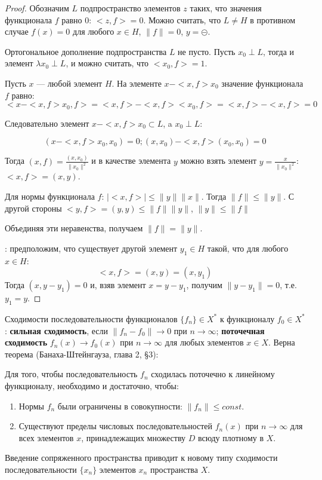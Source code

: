 \documentclass[12pt,a4paper,titlepage,oneside]{book}
\theoremstyle{definition}
\theoremstyle{plain}
\theoremstyle{remark}
\theoremstyle{remark}
\theoremstyle{remark}
\theoremstyle{remark}
\theoremstyle{plain}
\theoremstyle{plain}
\begin{document}
\begin{proof}
Обозначим $L$ подпространство элементов $z$ таких, что значения функционала $f$ равно 0: $<z, f>=0$. Можно считать, что $L\ne H$ в противном случае $f(x)=0$ для любого $x\in H$, $\lVert f\rVert = 0$, $y=\circleddash$.

Ортогональное дополнение подпространства $L$ не пусто. Пусть $x_0\perp L$, тогда и элемент $\lambda x_0\perp L$, и можно считать, что $<x_0, f>=1$.

Пусть $x$ --- любой элемент $H$. На элементе $x-<x, f>x_0$ значение функционала $f$ равно:
\begin{equation*}
<x-<x, f>x_0, f> = <x, f>-<x, f><x_0, f> = <x, f>-<x, f> = 0
\end{equation*}

Следовательно элемент $x-<x, f>x_0 \subset L$, a $x_0\perp L$:

\begin{equation*}
(x-<x, f>x_0, x_0) = 0; (x, x_0) - <x, f>(x_0, x_0) = 0
\end{equation*}

Тогда $(x, f) = \frac{(x, x_0)}{\lVert x_0\rVert^2}$ и в качестве элемента $y$ можно взять элемент $y=\frac{x}{\lVert x_0\rVert^2}$:$<x, f> = (x, y)$.

Для нормы функционала $f$: $\lvert <x, f>\rvert \le \lVert y\rVert\lVert x\rVert$. Тогда $\lVert f\rVert \le \lVert y\rVert$. С другой стороны $<y, f> = (y, y) \le \lVert f\rVert\lVert y\rVert$, $\lVert y\rVert\le\lVert f\rVert$

Объединяя эти неравенства, получаем $\lVert f\rVert = \lVert y\rVert$.

: предположим, что существует другой элемент $y_1 \in H$ такой, что для любого $x\in H$:
\begin{equation*}
<x, f> = (x, y) = (x, y_1)
\end{equation*}
Тогда $(x, y-y_1) = 0$ и, взяв элемент $x = y-y_1$, получим $\lVert y-y_1\rVert = 0$, т.е. $y_1 = y$.
\end{proof}
Сходимости последовательности функционалов $\{f_n\}\in X^*$ к функционалу $f_0\in X^*$: \textbf{сильная сходимость}, если $\lVert f_n - f_0\rVert \to 0$ при $n\to\infty$; \textbf{поточечная сходимость} $f_n(x)\to f_0(x)$ при $n\to\infty$ для любых элементов $x\in X$. Верна теорема (Банаха-Штейнгауза, глава 2, \S 3):

Для того, чтобы последовательность $f_n$ сходилась поточечно к линейному функционалу, необходимо и достаточно, чтобы:

\begin{enumerate}
\item Нормы $f_n$ были ограничены в совокупности: $\lVert f_n\rVert \le const$.
\item Существуют пределы числовых последовательностей $f_n(x)$ при $n\to\infty$ для всех элементов $x$, принадлежащих множеству $D$
    всюду плотному в $X$.
\end{enumerate}

Введение сопряженного пространства приводит к новому типу сходимости последовательности $\{x_n\}$ элементов $x_n$ пространства $X$.
\end{document}
